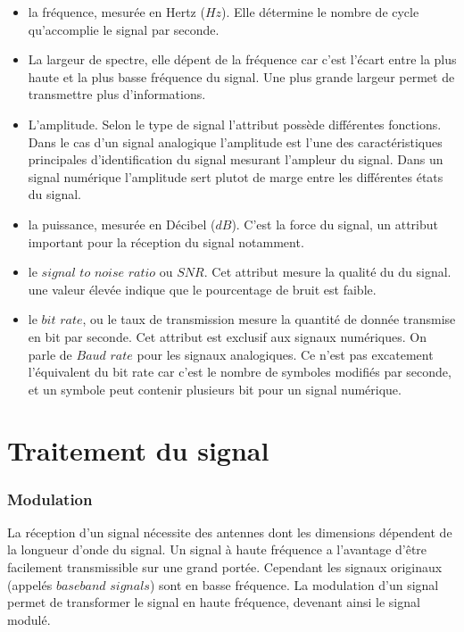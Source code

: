 \begin{itemize}

\item la fréquence, mesurée en Hertz ($Hz$). Elle détermine le nombre de cycle qu'accomplie le signal par seconde.
\item La largeur de spectre, elle dépent de la fréquence car c'est l'écart entre la plus haute et la plus basse fréquence du signal. Une plus grande largeur permet de transmettre plus d'informations.
\item L'amplitude. Selon le type de signal l'attribut possède différentes fonctions. Dans le cas d'un signal analogique l'amplitude est l'une des caractéristiques principales d'identification du signal mesurant l'ampleur du signal. Dans un signal numérique l'amplitude sert plutot de marge entre les différentes états du signal. 
\item la puissance, mesurée en Décibel ($dB$). C'est la force du signal, un attribut important pour la réception du signal notamment.
\item le $signal$ $to$ $noise$ $ratio$ ou $SNR$. Cet attribut mesure la qualité du du signal. une valeur élevée indique que le pourcentage de bruit est faible.
\item le $bit$ $rate$, ou le taux de transmission mesure la quantité de donnée transmise en bit par seconde. Cet attribut est exclusif aux signaux numériques. On parle de $Baud$ $rate$ pour les signaux analogiques. Ce n'est pas excatement l'équivalent du bit rate car c'est le nombre de symboles modifiés par seconde, et un symbole peut contenir plusieurs bit pour un signal numérique.

\end{itemize}

\section{Traitement du signal}

\subsubsection{Modulation}

La réception d'un signal nécessite des antennes dont les dimensions dépendent de la longueur d'onde du signal. Un signal à haute fréquence a l'avantage d'être facilement transmissible sur une grand portée. Cependant les signaux originaux (appelés $baseband$ $signals$) sont en basse fréquence. La modulation d'un signal permet de transformer le signal en haute fréquence, devenant ainsi le signal modulé.

